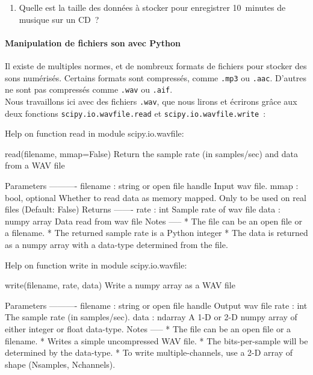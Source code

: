\begin{enumerate}
\item 
  Quelle est la taille des données à stocker pour enregistrer
  10~minutes de musique sur un CD~? 
\end{enumerate}



\newpage

\paragraph{Manipulation de fichiers son avec Python}

Il existe de multiples normes, et de nombreux formats de fichiers pour
stocker des sons numérisés. Certains formats sont compressés, comme
\texttt{.mp3} ou \texttt{.aac}. D'autres ne sont pas compressés
comme \texttt{.wav} ou \texttt{.aif}. \\
Nous travaillons ici avec des fichiers \texttt{.wav}, que nous lirons
et écrirons grâce aux deux fonctions \verb#scipy.io.wavfile.read# et
\verb#scipy.io.wavfile.write#~:

\begin{python}
Help on function read in module scipy.io.wavfile:

read(filename, mmap=False)
    Return the sample rate (in samples/sec) and data from a WAV file    

    Parameters
    ----------
    filename : string or open file handle
        Input wav file.
    mmap : bool, optional
        Whether to read data as memory mapped.
        Only to be used on real files (Default: False)
    Returns
    -------
    rate : int
        Sample rate of wav file
    data : numpy array
        Data read from wav file    
    Notes
    -----    
    * The file can be an open file or a filename.
    * The returned sample rate is a Python integer
    * The data is returned as a numpy array with a
      data-type determined from the file.  
\end{python}

\begin{python}
Help on function write in module scipy.io.wavfile:

write(filename, rate, data)
    Write a numpy array as a WAV file
    
    Parameters
    ----------
    filename : string or open file handle
        Output wav file
    rate : int
        The sample rate (in samples/sec).
    data : ndarray
        A 1-D or 2-D numpy array of either integer or float data-type.    
    Notes
    -----
    * The file can be an open file or a filename.
    * Writes a simple uncompressed WAV file.
    * The bits-per-sample will be determined by the data-type.
    * To write multiple-channels, use a 2-D array of shape
      (Nsamples, Nchannels).  
\end{python}

